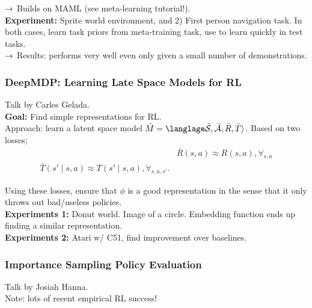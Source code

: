 $\rightarrow$ Builds on MAML (see meta-learning tutorial!). \\

{\bf Experiment:} Sprite world environment, and 2) First person navigation task. In both cases, learn task priors from meta-training task, use to learn quickly in test tasks. \\

$\rightarrow$ Results: performs very well even only given a small number of demonstrations. \\

\spacerule

\subsubsection{DeepMDP: Learning Late Space Models for RL}

Talk by Carles Gelada. \\

{\bf Goal:} Find simple representations for RL. \\

Approach: learn a latent space model $\bar{M} = \langlage \bar{\mc{S}}, \bar{\mc{A}}, \bar{R}, \bar{T} \rangle$. Based on two losses;
\begin{align}
    &\bar{R}(s,a) \approx R(s,a), \forall_{s,a} \\
    \bar{T}(s' \mid s,a) \approx T(s' \mid s,a), \forall_{s,a,s'}.
\end{align}

Using these losses, ensure that $\phi$ is a good representation in the sense that it only throws out bad/useless policies. \\

{\bf Experiments 1:} Donut world. Image of a circle. Embedding function ends up finding a similar representation. \\

{\bf Experiments 2:} Atari w/ C51, find improvement over baselines.

\spacerule

\subsubsection{Importance Sampling Policy Evaluation}

Talk by Josiah Hanna. \\

Note: lots of recent empirical RL success! \\

